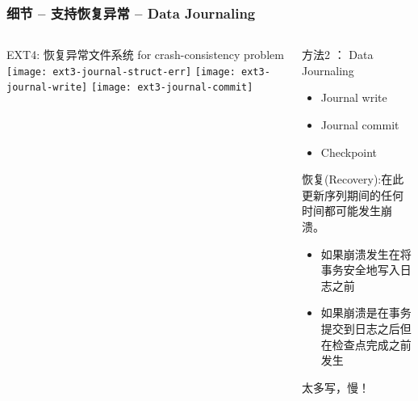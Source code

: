 \begin{frame}[fragile]
	\frametitle{细节 -- 支持恢复异常 -- Data Journaling}
	\begin{columns}
		\begin{column}{.5\textwidth}
			EXT4: 恢复异常文件系统 for crash-consistency problem
			\texttt{[image: ext3-journal-struct-err]}
			\pause
			\texttt{[image: ext3-journal-write]}
			\texttt{[image: ext3-journal-commit]}
		\end{column}
		\begin{column}{.5\textwidth}			
			方法2 ： Data Journaling
			\begin{itemize}
				\item  Journal write
				\item  Journal commit
				\item  Checkpoint
			\end{itemize}
			\pause
			恢复(Recovery):在此更新序列期间的任何时间都可能发生崩溃。
			\begin{itemize}	
				\item 如果崩溃发生在将事务安全地写入日志之前
				\item 如果崩溃是在事务提交到日志之后但在检查点完成之前发生

			\end{itemize}
			\pause
			\Large 太多写，慢！
		\end{column}
	\end{columns}
	
\end{frame}


